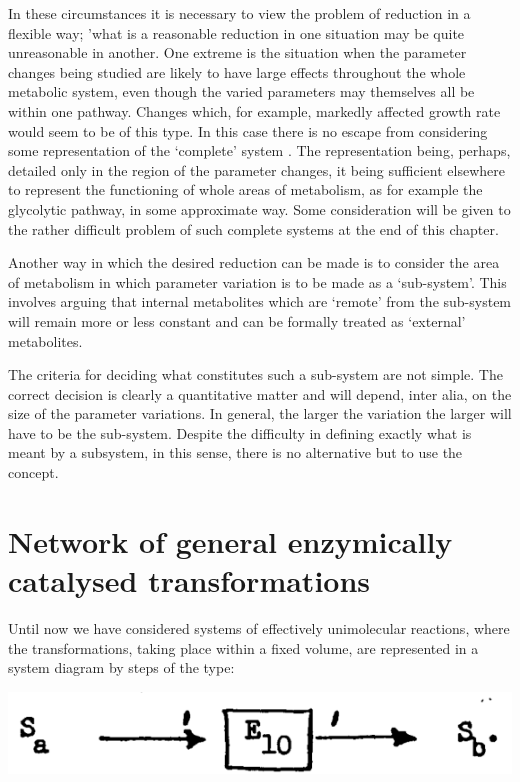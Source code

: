 In these circumstances it is necessary to view the problem of reduction in a flexible way; 'what is a reasonable reduction in one situation may be quite unreasonable in another. One extreme is the situation when the parameter changes being studied are likely to have large effects throughout the whole metabolic system, even though the varied parameters may themselves all be within one pathway. Changes which, for example, markedly affected growth rate would seem to be of this type. In this case there is no escape from considering some representation of the `complete' system . The representation being, perhaps, detailed only in the region of the parameter changes, it being sufficient elsewhere to represent the functioning of whole areas of metabolism, as for example the glycolytic pathway, in some approximate way. Some consideration will be given to the rather difficult problem of such complete systems at the end of this chapter.

Another way in which the desired reduction can be made is to consider the area of metabolism in which parameter variation is to be made as a `sub-system'. This involves arguing that internal metabolites which are `remote' from the sub-system will remain more or less constant and can be formally treated as `external' metabolites.

The criteria for deciding what constitutes such a sub-system are not simple. The correct decision is clearly a quantitative matter and will depend, inter alia, on the size of the parameter variations. In general, the larger the variation the larger will have to be the sub-system. Despite the difficulty in defining exactly what is meant by a subsystem, in this sense, there is no alternative but to use the concept.

\section{Network of general enzymically catalysed transformations}

Until now we have considered systems of effectively unimolecular reactions, where the transformations, taking place within a fixed volume, are represented in a system diagram by steps of the type:

\centerline{\includegraphics[scale=1]{figure2_pathway10.png}}

